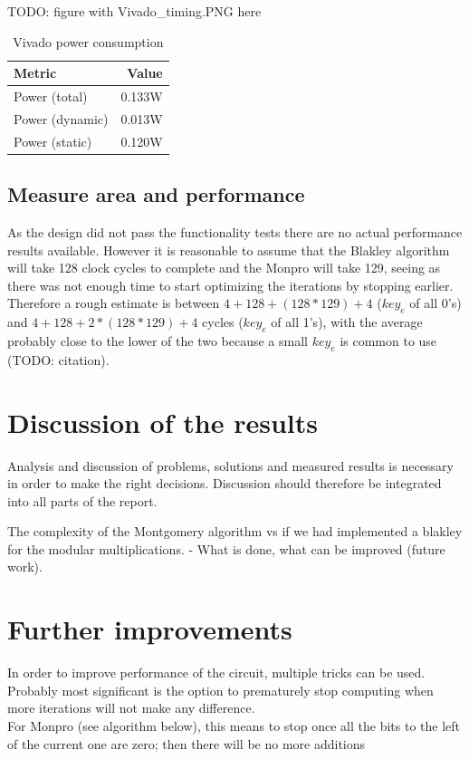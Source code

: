 TODO: figure with Vivado\_timing.PNG here

\begin{table}[H]
    \centering
    \begin{tabular}{l|r}
        Metric & Value \\ \hline
        Power (total) & 0.133W\\
        Power (dynamic) & 0.013W \\
        Power (static) & 0.120W \\
    \end{tabular}
    \caption{Vivado power consumption}
    \label{tab:vivado_synth_results}
\end{table}
\subsection{Measure area and performance}
As the design did not pass the functionality tests there are no actual performance results available. However it is reasonable to assume that the Blakley algorithm will take 128 clock cycles to complete and the Monpro will take 129, seeing as there was not enough time to start optimizing the iterations by stopping earlier.\\
Therefore a rough estimate is between $4+128+(128*129)+4$ ($key_e$ of all 0's) and $4+128+2*(128*129)+4$ cycles ($key_e$ of all 1's), with the average probably close to the lower of the two because a small $key_e$ is common to use (TODO: citation).


\section{Discussion of the results}
 
Analysis and discussion of problems, solutions and measured results is necessary in order to make the right decisions. Discussion should therefore be integrated into all parts of the report. 

The complexity of the Montgomery algorithm vs if we had implemented a blakley for the modular multiplications. 
- What is done, what can be improved (future work).

\section{Further improvements}
In order to improve performance of the circuit, multiple tricks can be used. Probably most significant is the option to prematurely stop computing when more iterations will not make any difference.\\
For Monpro (see algorithm below), this means to stop once all the bits to the left of the current one are zero; then there will be no more additions

\inputminted[fistline=13,lastline=26]{python}{../Project/monexp.py}
